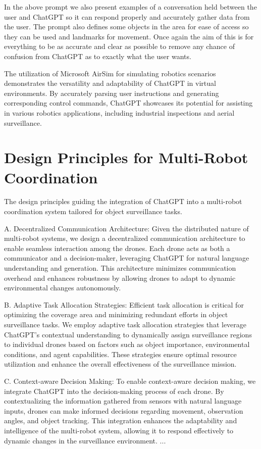 \documentclass[journal]{IEEEtran}
\begin{document}
In the above prompt we also present examples of a conversation held between the user and ChatGPT so it can respond properly and accurately gather data from the user. The prompt also defines some objects in the area for ease of access so they can be used and landmarks for movement. Once again the aim of this is for everything to be as accurate and clear as possible to remove any chance of confusion from ChatGPT as to exactly what the user wants.

The utilization of Microsoft AirSim for simulating robotics scenarios demonstrates the versatility and adaptability of ChatGPT in virtual environments. By accurately parsing user instructions and generating corresponding control commands, ChatGPT showcases its potential for assisting in various robotics applications, including industrial inspections and aerial surveillance.
\section{Design Principles for Multi-Robot Coordination}

 The design principles guiding the integration of ChatGPT into a multi-robot coordination system tailored for object surveillance tasks.

A. Decentralized Communication Architecture: Given the distributed nature of multi-robot systems, we design a decentralized communication architecture to enable seamless interaction among the drones. Each drone acts as both a communicator and a decision-maker, leveraging ChatGPT for natural language understanding and generation. This architecture minimizes communication overhead and enhances robustness by allowing drones to adapt to dynamic environmental changes autonomously.

B. Adaptive Task Allocation Strategies: Efficient task allocation is critical for optimizing the coverage area and minimizing redundant efforts in object surveillance tasks. We employ adaptive task allocation strategies that leverage ChatGPT's contextual understanding to dynamically assign surveillance regions to individual drones based on factors such as object importance, environmental conditions, and agent capabilities. These strategies ensure optimal resource utilization and enhance the overall effectiveness of the surveillance mission.

C. Context-aware Decision Making: To enable context-aware decision making, we integrate ChatGPT into the decision-making process of each drone. By contextualizing the information gathered from sensors with natural language inputs, drones can make informed decisions regarding movement, observation angles, and object tracking. This integration enhances the adaptability and intelligence of the multi-robot system, allowing it to respond effectively to dynamic changes in the surveillance environment.
...
\end{document}
